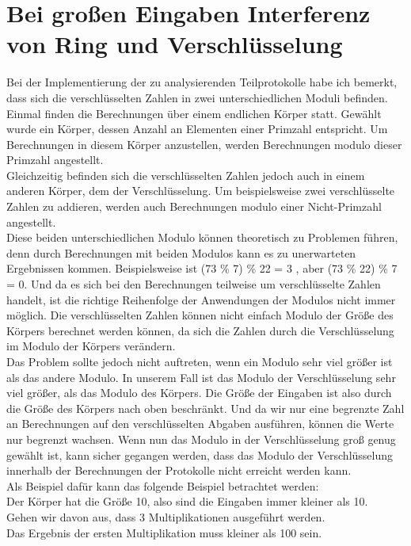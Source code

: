 \section{Bei großen Eingaben Interferenz von Ring und Verschlüsselung}
Bei der Implementierung der zu analysierenden Teilprotokolle habe ich bemerkt, dass sich die verschlüsselten Zahlen in zwei unterschiedlichen Moduli befinden. Einmal finden die Berechnungen über einem endlichen Körper statt. Gewählt wurde ein Körper, dessen Anzahl an Elementen einer Primzahl entspricht. Um Berechnungen in diesem Körper anzustellen, werden Berechnungen modulo dieser Primzahl angestellt.\\
Gleichzeitig befinden sich die verschlüsselten Zahlen jedoch auch in einem anderen Körper, dem der Verschlüsselung. Um beispielsweise zwei verschlüsselte Zahlen zu addieren, werden auch Berechnungen modulo einer Nicht-Primzahl angestellt.\\
Diese beiden unterschiedlichen Modulo können theoretisch zu Problemen führen, denn durch Berechnungen mit beiden Modulos kann es zu unerwarteten Ergebnissen kommen.
Beispielsweise ist (73 \% 7) \% 22  = 3 , aber (73 \% 22) \% 7 = 0. Und da es sich bei den Berechnungen teilweise um verschlüsselte Zahlen handelt, ist die richtige Reihenfolge der Anwendungen der Modulos nicht immer möglich. Die verschlüsselten Zahlen können nicht einfach Modulo der Größe des Körpers berechnet werden können, da sich die Zahlen durch die Verschlüsselung im Modulo der Körpers verändern.\\
Das Problem sollte jedoch nicht auftreten, wenn ein Modulo sehr viel größer ist als das andere Modulo. In unserem Fall ist das Modulo der Verschlüsselung sehr viel größer, als das Modulo des Körpers. Die Größe der Eingaben ist also durch die Größe des Körpers nach oben beschränkt. Und da wir nur eine begrenzte Zahl an Berechnungen auf den verschlüsselten Abgaben ausführen, können die Werte nur begrenzt wachsen. Wenn nun das Modulo in der Verschlüsselung groß genug gewählt ist, kann sicher gegangen werden, dass das Modulo der Verschlüsselung innerhalb der Berechnungen der Protokolle nicht erreicht werden kann.\\
Als Beispiel dafür kann das folgende Beispiel betrachtet werden:\\
Der Körper hat die Größe 10, also sind die Eingaben immer kleiner als 10.\\
Gehen wir davon aus, dass 3 Multiplikationen ausgeführt werden.\\
Das Ergebnis der ersten Multiplikation muss kleiner als 100 sein.\\
